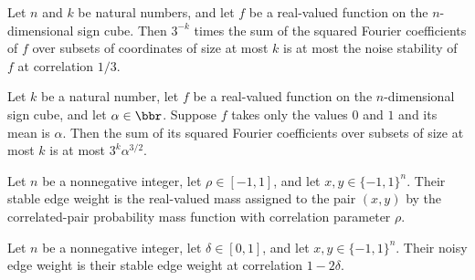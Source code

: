 \begin{theorem}
\label{FABL.oneThird_pow_mul_fourierWeightAtMost_le_noiseStability}
\leanok
{}
Let $n$ and $k$ be natural numbers, and let $f$ be a real-valued function on the
$n$-dimensional sign cube. Then $3^{-k}$ times the sum of the squared Fourier
coefficients of $f$ over subsets of coordinates of size at most $k$ is at most the noise
stability of $f$ at correlation $1/3$.
\end{theorem}

\begin{theorem}
\label{FABL.fourierWeightAtMost_le_three_pow_mul_rpow}
\leanok
{}
Let $k$ be a natural number, let $f$ be a real-valued function on the $n$-dimensional
sign cube, and let $\alpha\in\bbr$. Suppose $f$ takes only the values $0$ and $1$ and
its mean is $\alpha$. Then the sum of its squared Fourier coefficients over subsets of
size at most $k$ is at most $3^k\alpha^{3/2}$.
\end{theorem}

\begin{definition}
\label{FABL.stableHypercubeEdgeWeight}
\leanok
{}
Let $n$ be a nonnegative integer, let $\rho\in[-1,1]$, and let $x,y\in\{-1,1\}^n$. Their
stable edge weight is the real-valued mass assigned to the pair $(x,y)$ by the
correlated-pair probability mass function with correlation parameter $\rho$.
\end{definition}

\begin{definition}
\label{FABL.noisyHypercubeEdgeWeight}
\leanok
{}
Let $n$ be a nonnegative integer, let $\delta\in[0,1]$, and let $x,y\in\{-1,1\}^n$.
Their noisy edge weight is their stable edge weight at correlation $1-2\delta$.
\end{definition}

